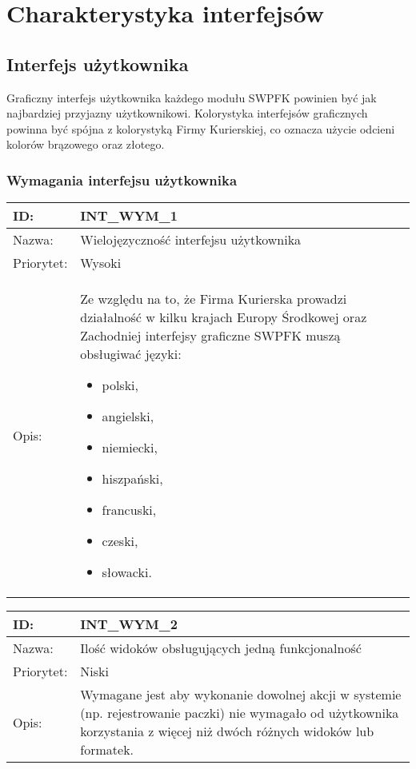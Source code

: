 \section{Charakterystyka interfejsów}

\subsection{Interfejs użytkownika}
Graficzny interfejs użytkownika każdego modułu SWPFK powinien być jak najbardziej przyjazny użytkownikowi. Kolorystyka interfejsów graficznych powinna być spójna z kolorystyką Firmy Kurierskiej, co oznacza użycie odcieni kolorów brązowego oraz złotego.

\subsubsection{Wymagania interfejsu użytkownika}
\begin{center}
\begin{tabular}[h]{|p{1.6cm}|p{13.5cm}|}
\hline
ID: & INT\_WYM\_1 \\ \hline
Nazwa: & Wielojęzyczność interfejsu użytkownika \\ \hline
Priorytet: & Wysoki \\ \hline
Opis: & Ze względu na to, że Firma Kurierska prowadzi działalność w kilku krajach Europy Środkowej oraz Zachodniej interfejsy graficzne SWPFK muszą obsługiwać języki:
\begin{itemize}
\item polski,
\item angielski,
\item niemiecki,
\item hiszpański,
\item francuski,
\item czeski,
\item słowacki.
\end{itemize} \\
\hline
\end{tabular}
\end{center}

\begin{center}
\begin{tabular}[h]{|p{1.6cm}|p{13.5cm}|}
\hline
ID: & INT\_WYM\_2 \\ \hline
Nazwa: & Ilość widoków obsługujących jedną funkcjonalność \\ \hline
Priorytet: & Niski \\ \hline
Opis: & Wymagane jest aby wykonanie dowolnej akcji w systemie (np. rejestrowanie paczki) nie wymagało od użytkownika korzystania z więcej niż dwóch różnych widoków lub formatek. \\
\hline
\end{tabular}
\end{center}


